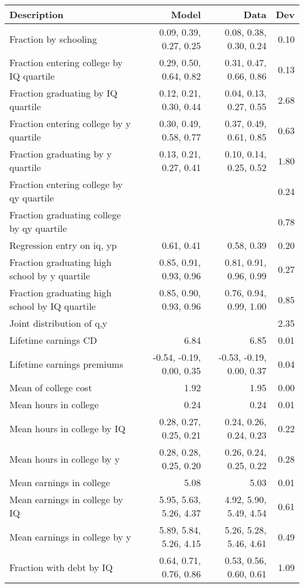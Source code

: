 \begin{tabular}{lrrr}
\hline
Description & Model  & Data  & Dev  \\ 
\hline
Fraction by schooling & 0.09, 0.39, 0.27, 0.25  & 0.08, 0.38, 0.30, 0.24  & 0.10  \\ 
Fraction entering college by IQ quartile & 0.29, 0.50, 0.64, 0.82  & 0.31, 0.47, 0.66, 0.86  & 0.13  \\ 
Fraction graduating by IQ quartile & 0.12, 0.21, 0.30, 0.44  & 0.04, 0.13, 0.27, 0.55  & 2.68  \\ 
Fraction entering college by y quartile & 0.30, 0.49, 0.58, 0.77  & 0.37, 0.49, 0.61, 0.85  & 0.63  \\ 
Fraction graduating by y quartile & 0.13, 0.21, 0.27, 0.41  & 0.10, 0.14, 0.25, 0.52  & 1.80  \\ 
Fraction entering college by qy quartile &   &   & 0.24  \\ 
Fraction graduating college by qy quartile &   &   & 0.78  \\ 
Regression entry on iq, yp & 0.61, 0.41  & 0.58, 0.39  & 0.20  \\ 
Fraction graduating high school by y quartile & 0.85, 0.91, 0.93, 0.96  & 0.81, 0.91, 0.96, 0.99  & 0.27  \\ 
Fraction graduating high school by IQ quartile & 0.85, 0.90, 0.93, 0.96  & 0.76, 0.94, 0.99, 1.00  & 0.85  \\ 
Joint distribution of q,y &   &   & 2.35  \\ 
Lifetime earnings CD & 6.84  & 6.85  & 0.01  \\ 
Lifetime earnings premiums & -0.54, -0.19, 0.00, 0.35  & -0.53, -0.19, 0.00, 0.37  & 0.04  \\ 
Mean of college cost & 1.92  & 1.95  & 0.00  \\ 
Mean hours in college & 0.24  & 0.24  & 0.01  \\ 
Mean hours in college by IQ & 0.28, 0.27, 0.25, 0.21  & 0.24, 0.26, 0.24, 0.23  & 0.22  \\ 
Mean hours in college by y & 0.28, 0.28, 0.25, 0.20  & 0.26, 0.24, 0.25, 0.22  & 0.28  \\ 
Mean earnings in college & 5.08  & 5.03  & 0.01  \\ 
Mean earnings in college by IQ & 5.95, 5.63, 5.26, 4.37  & 4.92, 5.90, 5.49, 4.54  & 0.61  \\ 
Mean earnings in college by y & 5.89, 5.84, 5.26, 4.15  & 5.26, 5.28, 5.46, 4.61  & 0.49  \\ 
Fraction with debt by IQ & 0.64, 0.71, 0.76, 0.86  & 0.53, 0.56, 0.60, 0.61  & 1.09  \\ 

\end{tabular}
